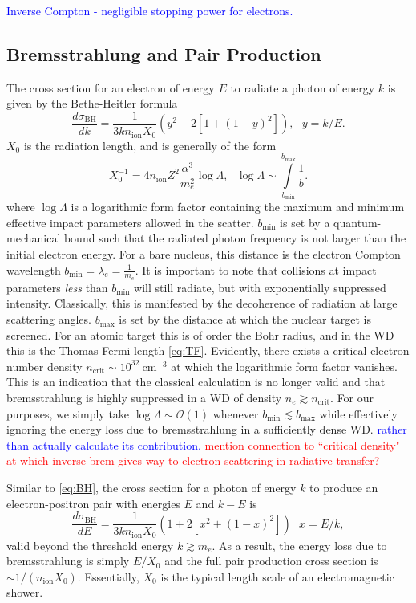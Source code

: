 \documentclass[twocolumn,showpacs,preprintnumbers,amsmath,amssymb,prd]{revtex4}
\newcommand{\OO}{\mathcal{O}}
\begin{document}
\begin{appendices}
\textcolor{blue}{Inverse Compton - negligible stopping power for electrons.}

\subsection*{Bremsstrahlung and Pair Production}
The cross section for an electron of energy $E$ to radiate a photon of energy $k$ is given by the Bethe-Heitler formula
\begin{equation}
\label{eq:BH}
\frac{d \sigma_\text{BH}}{dk} = \frac{1}{3 k n_\text{ion} X_0} (y^2+2 [1+ (1-y)^2]), ~~~ y = k/E.
\end{equation}
$X_0$ is the radiation length, and is generally of the form
\begin{equation}
X_0^{-1} = 4 n_\text{ion} Z^2 \frac{\alpha^3}{m_e^2} \log{\Lambda}, ~~~ \log{\Lambda} \sim \int \limits_{b_\text{min}}^{b_\text{max}} \frac{1}{b}.
\end{equation}
where $\log{\Lambda}$ is a logarithmic form factor containing the maximum and minimum effective impact parameters allowed in the scatter.
$b_\text{min}$ is set by a quantum-mechanical bound such that the radiated photon frequency is not larger than the initial electron energy.
For a bare nucleus, this distance is the electron Compton wavelength $b_\text{min} = \lambda_e = \frac{1}{m_e}$.
It is important to note that collisions at impact parameters \emph{less} than $b_\text{min}$ will still radiate, but with exponentially suppressed intensity.
Classically, this is manifested by the decoherence of radiation at large scattering angles.
$b_\text{max}$ is set by the distance at which the nuclear target is screened.
For an atomic target this is of order the Bohr radius, and in the WD this is the Thomas-Fermi length \eqref{eq:TF}.
Evidently, there exists a critical electron number density $n_\text{crit} \sim 10^{32} ~\text{cm}^{-3}$ at which the logarithmic form factor vanishes.
This is an indication that the classical calculation is no longer valid and that bremsstrahlung is highly suppressed in a WD of density $n_e \gtrsim n_\text{crit}$.
For our purposes, we simply take $\log{\Lambda} \sim \OO(1)$ whenever $b_\text{min} \lesssim b_\text{max}$ while effectively ignoring the energy loss due to bremsstrahlung in a sufficiently dense WD.
\textcolor{blue}{rather than actually calculate its contribution.} \textcolor{red}{mention connection to ``critical density" at which inverse brem gives way to electron scattering in radiative transfer?}

Similar to \eqref{eq:BH}, the cross section for a photon of energy $k$ to produce an electron-positron pair with energies $E$ and $k-E$ is
\begin{equation}
\label{eq:PP}
\frac{d \sigma_\text{BH}}{dE} = \frac{1}{3 k n_\text{ion} X_0} (1+ 2[x^2+ (1-x)^2]) ~~~ x = E/k,
\end{equation}
valid beyond the threshold energy $k \gtrsim m_e$.
As a result, the energy loss due to bremsstrahlung is simply $E/X_0$ and the full pair production cross section is $\sim 1/(n_\text{ion} X_0)$.
Essentially, $X_0$ is the typical length scale of an electromagnetic shower.


\end{appendices}
\end{document}
